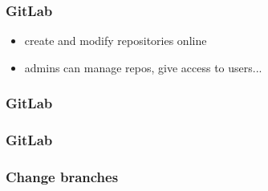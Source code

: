 \documentclass[aspectratio=169]{beamer}
\begin{document}

\begin{frame}
\frametitle{GitLab}
\begin{itemize}
	\item create and modify repositories online
	\item admins can manage repos, give access to users...
\end{itemize}
\end{frame}


\begin{frame}
\frametitle{GitLab}
\end{frame}


\begin{frame}
\frametitle{GitLab}
\end{frame}


\begin{frame}
\frametitle{Change branches}
\end{frame}
\end{document}
